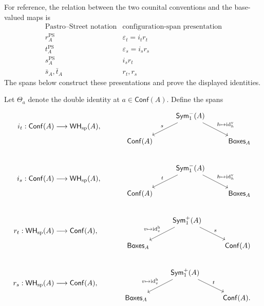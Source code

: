 \documentclass[oneside]{article}
\newcommand{\Boxes}{\mathsf{Boxes}}
\newcommand{\Conf}{\mathsf{Conf}}
\newcommand{\Sym}{\mathsf{Sym}}
\newcommand{\WH}{\mathsf{WH}}
\newcommand{\id}{\operatorname{id}}
\theoremstyle{plain}
\theoremstyle{definition}
\theoremstyle{remark}
\begin{document}
For reference, the relation between the two counital conventions and
the base-valued maps is
\[
\begin{array}{c|c}
\text{Pastro--Street notation}&\text{configuration-span presentation}\\\hline
r_A^{\mathrm{PS}}&\varepsilon_t=i_t r_t\\
t_A^{\mathrm{PS}}&\varepsilon_s=i_s r_s\\
s_A^{\mathrm{PS}}&i_s r_t\\
\bar s_A,\bar t_A&r_t,r_s
\end{array}
\]
The spans below construct these presentations and prove the displayed
identities.

Let \(\Theta_a\) denote the double identity at \(a\in\Conf(A)\). Define the spans
\begin{equation}
    \begin{aligned}
        i_t:\Conf(A)&\longrightarrow\WH_{\mathrm{sp}}(A),
        \qquad
        &
        \begin{tikzcd}
            & \Sym^-_1(A)
                \arrow[dl,"s"']
                \arrow[dr,"{h\mapsto\id_h^{\mathrm v}}"]
            & \\
            \Conf(A)
            &&
            \Boxes_A
        \end{tikzcd}
        \\[1.5em]
        i_s:\Conf(A)&\longrightarrow\WH_{\mathrm{sp}}(A),
        &
        \begin{tikzcd}
            & \Sym^-_1(A)
                \arrow[dl,"t"']
                \arrow[dr,"{h\mapsto\id_h^{\mathrm v}}"]
            & \\
            \Conf(A)
            &&
            \Boxes_A
        \end{tikzcd}
        \\[1.5em]
        r_t:\WH_{\mathrm{sp}}(A)&\longrightarrow\Conf(A),
        &
        \begin{tikzcd}
            & \Sym^+_1(A)
                \arrow[dl,"{v\mapsto\id_v^{\mathrm h}}"']
                \arrow[dr,"s"]
            & \\
            \Boxes_A
            &&
            \Conf(A)
        \end{tikzcd}
        \\[1.5em]
        r_s:\WH_{\mathrm{sp}}(A)&\longrightarrow\Conf(A),
        &
        \begin{tikzcd}
            & \Sym^+_1(A)
                \arrow[dl,"{v\mapsto\id_v^{\mathrm h}}"']
                \arrow[dr,"t"]
            & \\
            \Boxes_A
            &&
            \Conf(A).
        \end{tikzcd}
    \end{aligned}
\label{eq:cgqg-span-counital-retract-maps}
\end{equation}
\end{document}
